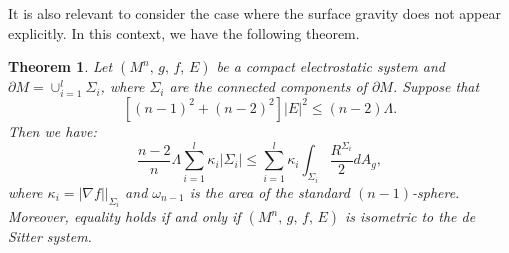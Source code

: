 \documentclass{amsart}
\newtheorem{theorem}{Theorem}
\numberwithin{equation}{section}
\begin{document}
It is also relevant to consider the case where the surface gravity does not appear explicitly. In this context, we have the following theorem.


\begin{theorem}
\label{teorigidezint}
		Let $(M^n,\, g,\, f,\, E)$ be a compact electrostatic system and $\partial M=\cup_{i=1}^{l} \Sigma_{i}$, where $\Sigma_{i}$ are the connected components of $\partial M$. Suppose that $$[(n-1)^2+(n-2)^2]\vert E\vert^{2}\leq (n-2)\Lambda.$$ Then we have:
		\begin{equation*}
			\frac{n-2}{n}\Lambda\sum_{i=1}^{l} \kappa_{i}|\Sigma_i|\leq\sum_{i=1}^{l} \kappa_{i} \int_{\Sigma_{i}}  \frac{R^{\Sigma_{i}}}{2}dA_g ,
		\end{equation*}
where $\kappa_{i}=|\nabla f|\Big|_{\Sigma_{i}}$ and $\omega_{n-1}$ is the area of the standard $(n-1)$-sphere. Moreover, equality holds if and only if $(M^n,\,g,\,f,\,E)$ is isometric to the de Sitter system.
\end{theorem}	
\end{document}
